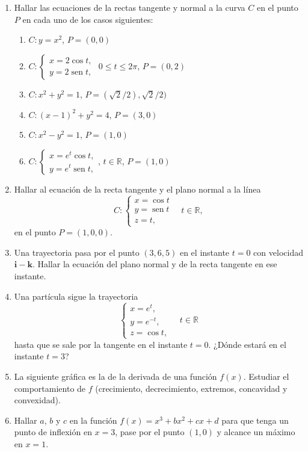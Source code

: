 \documentclass[a4paper,titlepage]{article}
\DeclareMathOperator{\sen}{sen}
\theoremstyle{solution}
\begin{document}
\begin{enumerate}[leftmargin=*]
\item Hallar las ecuaciones de la rectas tangente y normal a la curva $C$ en el punto $P$ en cada uno de los casos siguientes:
\begin{enumerate}
\item $C: y=x^2$, $P=(0,0)$
\item $C: \begin{cases}
x=2\cos t,\\
y=2\sen t,
\end{cases}
$ $0\leq t\leq 2\pi$, $P=(0,2)$
\item $C:x^2+y^2=1$, $P=(\sqrt{2}/2),\sqrt{2}/2)$
\item $C:(x-1)^2+y^2=4$, $P=(3,0)$
\item $C:x^2-y^2=1$, $P=(1,0)$
\item $C:\begin{cases}
x=e^t\cos t,\\
y=e^t\sen t,
\end{cases}
$, $t\in \mathbb{R}$, $P=(1,0)$
\end{enumerate}

\item Hallar al ecuación de la recta tangente y el plano normal a la línea
\[
C: 
\begin{cases}
x=\cos t \\
y=\sen t\\
z= t,
\end{cases}
\quad t\in \mathbb{R},
\]
en el punto $P=(1,0,0)$.

\item Una trayectoria pasa por el punto $(3,6,5)$ en el instante $t=0$ con velocidad $\mathbf{i}-\mathbf{k}$. 
Hallar la ecuación del plano normal y de la recta tangente en ese instante.

\item Una partícula sigue la trayectoria
\[
\begin{cases}
x=e^t,\\
y=e^{-t},\\
z=\cos t,
\end{cases}
\quad t\in \mathbb{R}
\]
hasta que se sale por la tangente en el instante $t=0$. ¿Dónde estará en el instante $t=3$?

\item La siguiente gráfica es la de la derivada de una función $f(x)$.
Estudiar el comportamiento de $f$ (crecimiento, decrecimiento, extremos, concavidad y convexidad).
\[

\]

\item Hallar $a$, $b$ y $c$ en la función  $f(x)=x^3+bx^2+cx+d$ para que tenga un punto de inflexión en $x=3$, pase por el punto $(1,0)$ y alcance un máximo en $x=1$.


\end{enumerate}
\end{document}
